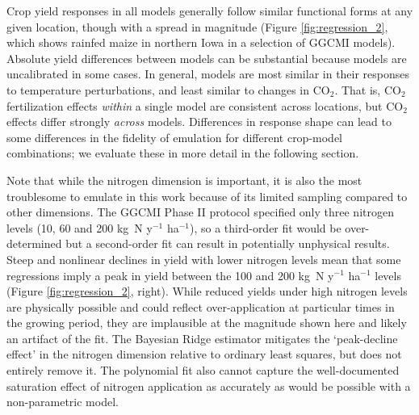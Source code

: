 \documentclass[gmd, manuscript]{copernicus} %
\begin{document}
Crop yield responses in all models generally follow similar functional forms at any given location, though with a spread in magnitude (Figure \ref{fig:regression_2}, which shows rainfed maize in northern Iowa in a selection of GGCMI models). 
Absolute yield differences between models can be substantial because models are uncalibrated in some cases.
In general, models are most similar in their responses to temperature perturbations, and least similar to changes in CO$_2$. 
That is, CO$_2$ fertilization effects \textit{within} a single model are consistent across locations, but CO$_2$ effects differ strongly \textit{across} models. 
Differences in response shape can lead to some differences in the fidelity of emulation for different crop-model combinations; we evaluate these in more detail in the following section. 

Note that while the nitrogen dimension is important, it is also the most troublesome to emulate in this work because of its limited sampling compared to other dimensions. 
The GGCMI Phase II protocol specified only three nitrogen levels (10, 60 and 200 kg~N y$^{-1}$ ha$^{-1}$), so a third-order fit would be over-determined but a second-order fit can result in potentially unphysical results. 
Steep and nonlinear declines in yield with lower nitrogen levels mean that some regressions imply a peak in yield between the 100 and 200 kg~N y$^{-1}$ ha$^{-1}$ levels (Figure \ref{fig:regression_2}, right). 
While reduced yields under high nitrogen levels are physically possible and could reflect over-application at particular times in the growing period, they are implausible at the magnitude shown here and likely an artifact of the fit. 
The Bayesian Ridge estimator mitigates the `peak-decline effect' in the nitrogen dimension relative to ordinary least squares, but does not entirely remove it. 
The polynomial fit also cannot capture the well-documented saturation effect of nitrogen application \citep[e.g.][]{Torsten77} as accurately as would be possible with a non-parametric model. 
\end{document}
